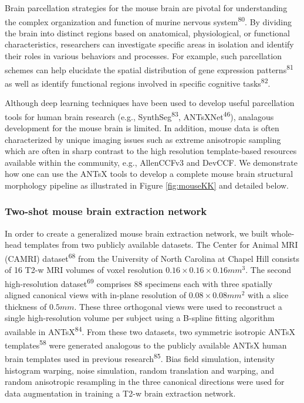 \documentclass[
  12pt,
]{article}
\begin{document}
Brain parcellation strategies for the mouse brain are pivotal for
understanding the complex organization and function of murine nervous
system\textsuperscript{80}. By dividing the brain into distinct regions
based on anatomical, physiological, or functional characteristics,
researchers can investigate specific areas in isolation and identify
their roles in various behaviors and processes. For example, such
parcellation schemes can help elucidate the spatial distribution of gene
expression patterns\textsuperscript{81} as well as identify functional
regions involved in specific cognitive tasks\textsuperscript{82}.

Although deep learning techniques have been used to develop useful
parcellation tools for human brain research (e.g.,
SynthSeg\textsuperscript{83}, ANTsXNet\textsuperscript{46}), analagous
development for the mouse brain is limited. In addition, mouse data is
often characterized by unique imaging issues such as extreme anisotropic
sampling which are often in sharp contrast to the high resolution
template-based resources available within the community, e.g.,
AllenCCFv3 and DevCCF. We demonstrate how one can use the ANTsX tools to
develop a complete mouse brain structural morphology pipeline as
illustrated in Figure \ref{fig:mouseKK} and detailed below.

\subsubsection{Two-shot mouse brain extraction
network}\label{two-shot-mouse-brain-extraction-network}

In order to create a generalized mouse brain extraction network, we
built whole-head templates from two publicly available datasets. The
Center for Animal MRI (CAMRI) dataset\textsuperscript{68} from the
University of North Carolina at Chapel Hill consists of 16 T2-w MRI
volumes of voxel resolution \(0.16
\times 0.16 \times 0.16 mm^3\). The second high-resolution
dataset\textsuperscript{69} comprises 88 specimens each with three
spatially aligned canonical views with in-plane resolution of
\(0.08 \times 0.08 mm^2\) with a slice thickness of \(0.5 mm\). These
three orthogonal views were used to reconstruct a single high-resolution
volume per subject using a B-spline fitting algorithm available in
ANTsX\textsuperscript{84}. From these two datasets, two symmetric
isotropic ANTsX templates\textsuperscript{58} were generated analogous
to the publicly available ANTsX human brain templates used in previous
research\textsuperscript{85}. Bias field simulation, intensity histogram
warping, noise simulation, random translation and warping, and random
anisotropic resampling in the three canonical directions were used for
data augmentation in training a T2-w brain extraction network.
\end{document}
